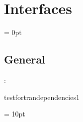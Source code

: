
\section{Interfaces} 


\parskip = 0pt

\vspace{3mm} \subsection*{General}

: 

testfortrandependencies1
\vspace{2mm}

\vspace{5mm}\parskip = 10pt 
